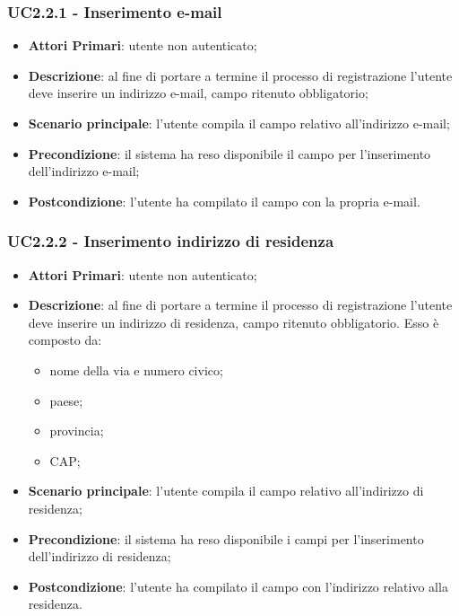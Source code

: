 \subsubsection{UC2.2.1 - Inserimento e-mail}
\begin{itemize}
	\item \textbf{Attori Primari}: utente non autenticato;
	\item \textbf{Descrizione}: al fine di portare a termine il processo di registrazione l'utente deve inserire un indirizzo e-mail, campo ritenuto obbligatorio;
	\item \textbf{Scenario principale}: l'utente compila il campo relativo all'indirizzo e-mail;
	\item \textbf{Precondizione}: il sistema ha reso disponibile il campo per l'inserimento dell'indirizzo e-mail;
	\item \textbf{Postcondizione}: l'utente ha compilato il campo con la propria e-mail.
	
\end{itemize}
\subsubsection{UC2.2.2 - Inserimento indirizzo di residenza}
\begin{itemize}
	\item \textbf{Attori Primari}: utente non autenticato;
	\item \textbf{Descrizione}: al fine di portare a termine il processo di registrazione l'utente deve inserire un indirizzo di residenza, campo ritenuto obbligatorio. Esso è composto da: 
	\begin{itemize}
	\item nome della via e numero civico;
	\item paese;
	\item provincia;
	\item CAP;

	\end{itemize}
	\item \textbf{Scenario principale}: l'utente compila il campo relativo all'indirizzo di residenza;
	\item \textbf{Precondizione}: il sistema ha reso disponibile i campi per l'inserimento dell'indirizzo di residenza;
	\item \textbf{Postcondizione}: l'utente ha compilato il campo con l'indirizzo relativo alla residenza.
\end{itemize}
